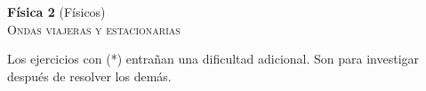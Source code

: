 \documentclass[11pt,spanish,a4paper]{article}
\begin{document}
\begin{center}
\textbf{Física 2} (Físicos) \hfill {}\\
	\textsc{\LARGE Ondas viajeras y estacionarias}
\end{center}


Los ejercicios con (*) entrañan una dificultad adicional. Son para investigar después de resolver los demás.



\begin{enumerate}


}




\end{enumerate}
\end{document}
